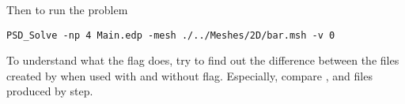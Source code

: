 Then to run the problem

\begin{lstlisting}[style=BashInputStyle]
PSD_Solve -np 4 Main.edp -mesh ./../Meshes/2D/bar.msh -v 0
\end{lstlisting}

To understand what the flag does, try to find out the difference between
the files created by  when used with and without
 flag. Especially, compare
,  and
 files produced by
 step.
